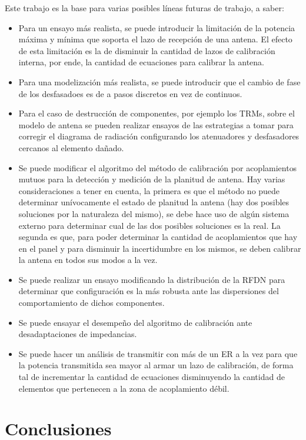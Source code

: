 Este trabajo es la base para varias posibles líneas futuras de trabajo, a saber:
\begin{itemize}
	\item Para un ensayo más realista, se puede introducir la limitación de la potencia máxima y mínima que soporta el lazo 
		de recepción de una antena. El efecto de esta limitación es la de disminuir la cantidad de lazos de calibración interna, 
		por ende, la cantidad de ecuaciones para calibrar la antena.
	\item Para una modelización más realista, se puede introducir que el cambio de fase de los desfasadoes es de a pasos discretos
		en vez de continuos.
	\item Para el caso de destrucción de componentes, por ejemplo los TRMs, sobre el modelo de antena se pueden realizar ensayos 
		de las estrategias a tomar para corregir el diagrama de radiación configurando los atenuadores y desfasadores cercanos al 
		elemento dañado.
	\item Se puede modificar el algoritmo del método de calibración por acoplamientos mutuos para la detección y medición de 
		la planitud de antena. Hay varias consideraciones a tener en cuenta, la primera es que el método no puede determinar 
		unívocamente el estado de planitud la antena (hay dos posibles soluciones por la naturaleza del mismo), se debe hace uso de 
		algún sistema externo para determinar cual de las dos posibles soluciones es la real. La segunda es que, para poder determinar
		la cantidad de acoplamientos que hay en el panel y para disminuir la incertidumbre en los mismos, se deben calibrar la antena 
		en todos sus modos a la vez.
	\item Se puede realizar un ensayo modificando la distribución de la RFDN para determinar que configuración es la más robusta ante 
		las dispersiones del comportamiento de dichos componentes.
	\item Se puede ensayar el desempeño del algoritmo de calibración ante desadaptaciones de impedancias. 
	\item Se puede hacer un análisis de transmitir con más de un ER a la vez para que la potencia transmitida sea mayor al armar
		un lazo de calibración, de forma tal de incrementar la cantidad de ecuaciones disminuyendo la cantidad de elementos que
		pertenecen a la zona de acoplamiento débil. 
\end{itemize}

\section{Conclusiones}

